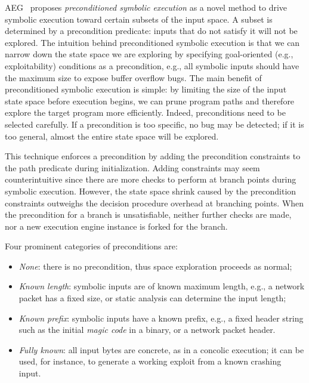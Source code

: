 {\sc AEG}~\cite{AEG-NDSS11} proposes {\em preconditioned symbolic execution} as a novel method to drive symbolic execution toward certain subsets of the input space. A subset is determined by a precondition predicate: inputs that do not satisfy it will not be explored. The intuition behind preconditioned symbolic execution is that we can narrow down the state space we are exploring by specifying goal-oriented (e.g., exploitability) conditions as a precondition, e.g., all symbolic inputs should have the maximum size to expose buffer overflow bugs. The main benefit of preconditioned symbolic execution is simple: by limiting the size of the input state space before execution begins, we can prune program paths and therefore explore the target program more efficiently.
Indeed, preconditions need to be selected carefully. If a precondition is too specific, no bug may be detected; if it is too general, almost the entire state space will be explored. %

This technique enforces a precondition by adding the precondition constraints to the path predicate during initialization. Adding constraints may seem counterintuitive since there are more checks to perform at branch points during symbolic execution. However, the state space shrink caused by the precondition constraints outweighs the decision procedure overhead at branching points. When the precondition for a branch is unsatisfiable, neither further checks are made, nor a new execution engine instance is forked for the branch.%

Four prominent categories of preconditions are:
\begin{itemize}
\item {\em None}: there is no precondition, thus space exploration proceeds as normal;
\item {\em Known length}: symbolic inputs are of known maximum length, e.g., a network packet has a fixed size, or static analysis can determine the input length;
\item {\em Known prefix}: symbolic inputs have a known prefix, e.g., a fixed header string such as the initial {\em magic code} in a binary, or a network packet header.
\item {\em Fully known}: all input bytes are concrete, as in a concolic execution; it can be used, for instance, to generate a working exploit from a known crashing input. 
\end{itemize}

